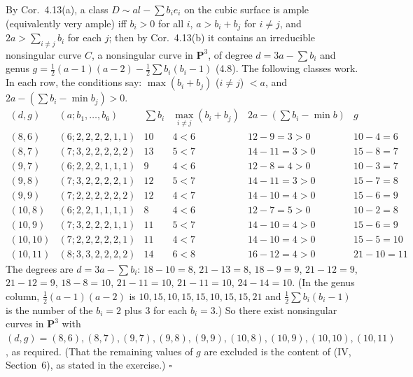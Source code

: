 \documentclass[11pt]{article}
\begin{document}
\pf
By Cor.~4.13(a), a class $D\sim al-\sum b_ie_i$ on the cubic surface is ample (equivalently very ample) iff $b_i>0$ for all $i$, $a>b_i+b_j$ for $i\ne j$, and $2a>\sum_{i\ne j}b_i$ for each $j$; then by Cor.~4.13(b) it contains an irreducible nonsingular curve $C$, a nonsingular curve in $\mathbf P^3$, of degree $d=3a-\sum b_i$ and genus $g=\frac12(a-1)(a-2)-\frac12\sum b_i(b_i-1)$ (4.8). The following classes work. In each row, the conditions say: $\max(b_i+b_j)$ ($i\ne j$) $<a$, and $2a-(\sum b_i-\min b_j)>0$.
\[
\begin{array}{c|c|c|c|c|c}
(d,g)&(a;b_1,\dots,b_6)&\sum b_i&\max_{i\neq j}(b_i+b_j)&2a-(\sum b_i-\min b)&g\\\hline
(8,6)&(6;2,2,2,2,1,1)&10&4<6&12-9=3>0&10-4=6\\
(8,7)&(7;3,2,2,2,2,2)&13&5<7&14-11=3>0&15-8=7\\
(9,7)&(6;2,2,2,1,1,1)&9&4<6&12-8=4>0&10-3=7\\
(9,8)&(7;3,2,2,2,2,1)&12&5<7&14-11=3>0&15-7=8\\
(9,9)&(7;2,2,2,2,2,2)&12&4<7&14-10=4>0&15-6=9\\
(10,8)&(6;2,2,1,1,1,1)&8&4<6&12-7=5>0&10-2=8\\
(10,9)&(7;3,2,2,2,1,1)&11&5<7&14-10=4>0&15-6=9\\
(10,10)&(7;2,2,2,2,2,1)&11&4<7&14-10=4>0&15-5=10\\
(10,11)&(8;3,3,2,2,2,2)&14&6<8&16-12=4>0&21-10=11
\end{array}
\]
The degrees are $d=3a-\sum b_i$: $18-10=8$, $21-13=8$, $18-9=9$, $21-12=9$, $21-12=9$, $18-8=10$, $21-11=10$, $21-11=10$, $24-14=10$. (In the genus column, $\frac12(a-1)(a-2)$ is $10,15,10,15,15,10,15,15,21$ and $\frac12\sum b_i(b_i-1)$ is the number of the $b_i=2$ plus $3$ for each $b_i=3$.) So there exist nonsingular curves in $\mathbf P^3$ with $(d,g)=(8,6),(8,7),(9,7),(9,8),(9,9),(10,8),(10,9),(10,10),(10,11)$, as required. (That the remaining values of $g$ are excluded is the content of (IV, Section~6), as stated in the exercise.) \hfill$\square$
\end{document}
